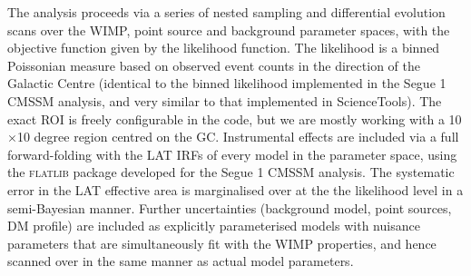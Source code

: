 \documentclass{article}
\begin{document}
The analysis proceeds via a series of nested sampling and differential evolution scans over the WIMP, point source and background parameter spaces, with the objective function given by the likelihood function.  The likelihood is a binned Poissonian measure based on observed event counts in the direction of the Galactic Centre (identical to the binned likelihood implemented in the Segue 1 CMSSM analysis, and very similar to that implemented in ScienceTools).  The exact ROI is freely configurable in the code, but we are mostly working with a 10$\times$10 degree region centred on the GC.  Instrumental effects are included via a full forward-folding with the LAT IRFs of every model in the parameter space, using the \textsc{flatlib} package developed for the Segue 1 CMSSM analysis.  The systematic error in the LAT effective area is marginalised over at the the likelihood level in a semi-Bayesian manner. Further uncertainties (background model, point sources, DM profile) are included as explicitly parameterised models with nuisance parameters that are simultaneously fit with the WIMP properties, and hence scanned over in the same manner as actual model parameters.
\end{document}
